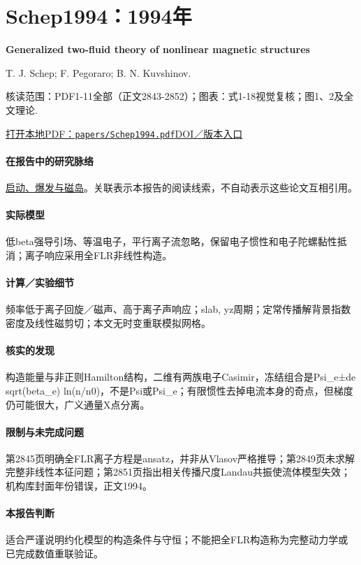 \documentclass[UTF8,a4paper,11pt,openany,fontset=fandol]{ctexbook}
\begin{document}
\section{Schep1994：1994年}\label{paper:Schep1994}

\textbf{Generalized two-fluid theory of nonlinear magnetic structures}\citep{Schep1994}\

T. J. Schep;  F. Pegoraro;  B. N. Kuvshinov.

\textsf{核读范围：}PDF1-11全部（正文2843-2852）；\textsf{图表：}式1-18视觉复核；图1、2及全文理论.

\href{run:../papers/Schep1994.pdf}{打开本地PDF：\texttt{papers/Schep1994.pdf}}\quad\href{https://doi.org/10.1063/1.870523}{DOI／版本入口}

\paragraph{在报告中的研究脉络}\hyperref[story:onset]{启动、爆发与磁岛}。关联表示本报告的阅读线索，不自动表示这些论文互相引用。

\paragraph{实际模型}低beta强导引场、等温电子，平行离子流忽略，保留电子惯性和电子陀螺黏性抵消；离子响应采用全FLR非线性构造。

\paragraph{计算／实验细节}频率低于离子回旋／磁声、高于离子声响应；slab, yz周期；定常传播解背景指数密度及线性磁剪切；本文无时变重联模拟网格。

\paragraph{核实的发现}构造能量与非正则Hamilton结构，二维有两族电子Casimir，冻结组合是Psi\_e±de sqrt(beta\_e) ln(n/n0)，不是Psi或Psi\_e；有限惯性去掉电流本身的奇点，但梯度仍可能很大，广义通量X点分离。

\paragraph{限制与未完成问题}第2845页明确全FLR离子方程是ansatz，并非从Vlasov严格推导；第2849页未求解完整非线性本征问题；第2851页指出相关传播尺度Landau共振使流体模型失效；机构库封面年份错误，正文1994。

\paragraph{本报告判断}适合严谨说明约化模型的构造条件与守恒；不能把全FLR构造称为完整动力学或已完成数值重联验证。
\end{document}

